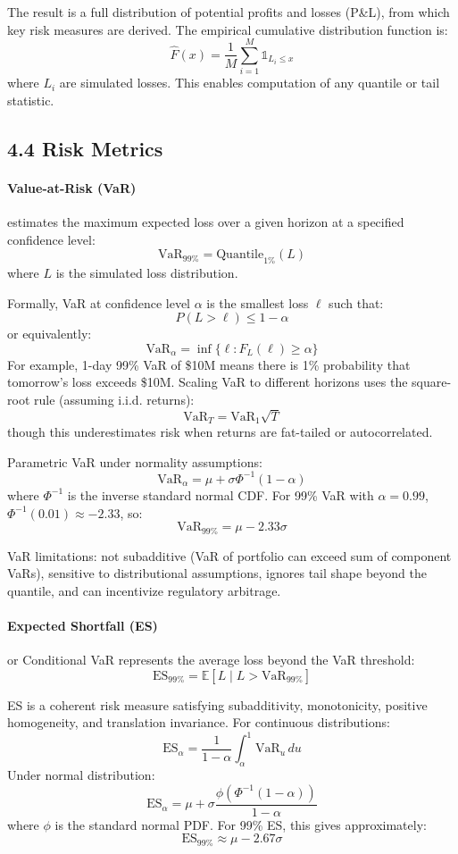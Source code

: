 \documentclass[11pt,a4paper]{article}
\begin{document}
The result is a full distribution of potential profits and losses (P\&L), from which key risk measures are derived. The empirical cumulative distribution function is:
\[
\hat{F}(x) = \frac{1}{M}\sum_{i=1}^M \mathbb{1}_{L_i \leq x}
\]
where $L_i$ are simulated losses. This enables computation of any quantile or tail statistic.

\subsection*{4.4 Risk Metrics}

\paragraph{Value-at-Risk (VaR)} estimates the maximum expected loss over a given horizon at a specified confidence level:
\[
\text{VaR}_{99\%} = \text{Quantile}_{1\%}(L)
\]
where $L$ is the simulated loss distribution.

Formally, VaR at confidence level $\alpha$ is the smallest loss $\ell$ such that:
\[
P(L > \ell) \leq 1 - \alpha
\]
or equivalently:
\[
\text{VaR}_{\alpha} = \inf\{\ell : F_L(\ell) \geq \alpha\}
\]
For example, 1-day 99\% VaR of \$10M means there is 1\% probability that tomorrow's loss exceeds \$10M. Scaling VaR to different horizons uses the square-root rule (assuming i.i.d. returns):
\[
\text{VaR}_T = \text{VaR}_1 \sqrt{T}
\]
though this underestimates risk when returns are fat-tailed or autocorrelated.

Parametric VaR under normality assumptions:
\[
\text{VaR}_{\alpha} = \mu + \sigma \Phi^{-1}(1-\alpha)
\]
where $\Phi^{-1}$ is the inverse standard normal CDF. For 99\% VaR with $\alpha = 0.99$, $\Phi^{-1}(0.01) \approx -2.33$, so:
\[
\text{VaR}_{99\%} = \mu - 2.33\sigma
\]

VaR limitations: not subadditive (VaR of portfolio can exceed sum of component VaRs), sensitive to distributional assumptions, ignores tail shape beyond the quantile, and can incentivize regulatory arbitrage.

\paragraph{Expected Shortfall (ES)} or Conditional VaR represents the average loss beyond the VaR threshold:
\[
\text{ES}_{99\%} = \mathbb{E}[L \mid L > \text{VaR}_{99\%}]
\]

ES is a coherent risk measure satisfying subadditivity, monotonicity, positive homogeneity, and translation invariance. For continuous distributions:
\[
\text{ES}_{\alpha} = \frac{1}{1-\alpha}\int_{\alpha}^1 \text{VaR}_u\, du
\]
Under normal distribution:
\[
\text{ES}_{\alpha} = \mu + \sigma \frac{\phi(\Phi^{-1}(1-\alpha))}{1-\alpha}
\]
where $\phi$ is the standard normal PDF. For 99\% ES, this gives approximately:
\[
\text{ES}_{99\%} \approx \mu - 2.67\sigma
\]
\end{document}
